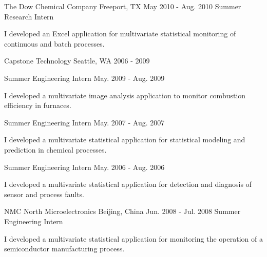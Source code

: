 \begin{cventries}
\cventry
{The Dow Chemical Company} %
{Freeport, TX} %
{May 2010 - Aug. 2010} %
{Summer Research Intern} %
{
\begin{cvitems} %
\item {I developed an Excel application for multivariate statistical monitoring of continuous and batch processes.}
\end{cvitems}
}
\cvmultientry
{Capstone Technology} %
{Seattle, WA}
{2006 - 2009} %
{
\cvsubentry
{Summer Engineering Intern} %
{} %
{May. 2009 - Aug. 2009} %
{
\begin{cvitems} %
\item {I developed a multivariate image analysis application to monitor combustion efficiency in furnaces.}
\end{cvitems}
}
\cvsubentry
{Summer Engineering Intern} %
{} %
{May. 2007 - Aug. 2007} %
{
\begin{cvitems} %
\item {I developed a multivariate statistical application for statistical modeling and prediction in chemical processes.}
\end{cvitems}
}
\cvsubentry
{Summer Engineering Intern} %
{} %
{May. 2006 - Aug. 2006} %
{
\begin{cvitems} %
\item {I developed a multivariate statistical application for detection and diagnosis of sensor and process faults.}
\end{cvitems}
}
}

\cventry
{NMC North Microelectronics} %
{Beijing, China} %
{Jun. 2008 - Jul. 2008} %
{Summer Engineering Intern} %
{
\begin{cvitems} %
\item {I developed a multivariate statistical application for monitoring the operation of a semiconductor manufacturing process.}
\end{cvitems}
}
\end{cventries}
